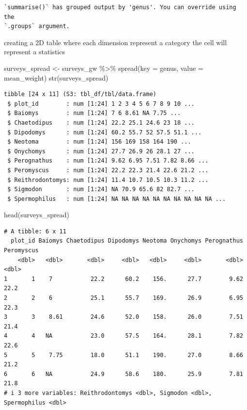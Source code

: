 \documentclass[
  letterpaper,
  DIV=11,
  numbers=noendperiod]{scrreprt}
\newenvironment{Shaded}{\begin{snugshade}}{\end{snugshade}}
\newcommand{\AttributeTok}[1]{\textcolor[rgb]{0.40,0.45,0.13}{#1}}
\newcommand{\FunctionTok}[1]{\textcolor[rgb]{0.28,0.35,0.67}{#1}}
\newcommand{\NormalTok}[1]{\textcolor[rgb]{0.00,0.23,0.31}{#1}}
\newcommand{\OtherTok}[1]{\textcolor[rgb]{0.00,0.23,0.31}{#1}}
\newcommand{\SpecialCharTok}[1]{\textcolor[rgb]{0.37,0.37,0.37}{#1}}
\begin{document}
\begin{verbatim}
`summarise()` has grouped output by 'genus'. You can override using the
`.groups` argument.
\end{verbatim}

creating a 2D table where each dimension represent a category the cell
will represent a statistics

\begin{Shaded}
\begin{Highlighting}[]
\NormalTok{surveys\_spread }\OtherTok{\textless{}{-}}\NormalTok{ surveys\_gw }\SpecialCharTok{\%\textgreater{}\%}
    \FunctionTok{spread}\NormalTok{(}\AttributeTok{key =}\NormalTok{ genus, }\AttributeTok{value =}\NormalTok{ mean\_weight)}
\FunctionTok{str}\NormalTok{(surveys\_spread)}
\end{Highlighting}
\end{Shaded}

\begin{verbatim}
tibble [24 x 11] (S3: tbl_df/tbl/data.frame)
 $ plot_id        : num [1:24] 1 2 3 4 5 6 7 8 9 10 ...
 $ Baiomys        : num [1:24] 7 6 8.61 NA 7.75 ...
 $ Chaetodipus    : num [1:24] 22.2 25.1 24.6 23 18 ...
 $ Dipodomys      : num [1:24] 60.2 55.7 52 57.5 51.1 ...
 $ Neotoma        : num [1:24] 156 169 158 164 190 ...
 $ Onychomys      : num [1:24] 27.7 26.9 26 28.1 27 ...
 $ Perognathus    : num [1:24] 9.62 6.95 7.51 7.82 8.66 ...
 $ Peromyscus     : num [1:24] 22.2 22.3 21.4 22.6 21.2 ...
 $ Reithrodontomys: num [1:24] 11.4 10.7 10.5 10.3 11.2 ...
 $ Sigmodon       : num [1:24] NA 70.9 65.6 82 82.7 ...
 $ Spermophilus   : num [1:24] NA NA NA NA NA NA NA NA NA NA ...
\end{verbatim}

\begin{Shaded}
\begin{Highlighting}[]
\FunctionTok{head}\NormalTok{(surveys\_spread)}
\end{Highlighting}
\end{Shaded}

\begin{verbatim}
# A tibble: 6 x 11
  plot_id Baiomys Chaetodipus Dipodomys Neotoma Onychomys Perognathus Peromyscus
    <dbl>   <dbl>       <dbl>     <dbl>   <dbl>     <dbl>       <dbl>      <dbl>
1       1    7           22.2      60.2    156.      27.7        9.62       22.2
2       2    6           25.1      55.7    169.      26.9        6.95       22.3
3       3    8.61        24.6      52.0    158.      26.0        7.51       21.4
4       4   NA           23.0      57.5    164.      28.1        7.82       22.6
5       5    7.75        18.0      51.1    190.      27.0        8.66       21.2
6       6   NA           24.9      58.6    180.      25.9        7.81       21.8
# i 3 more variables: Reithrodontomys <dbl>, Sigmodon <dbl>, Spermophilus <dbl>
\end{verbatim}
\end{document}
